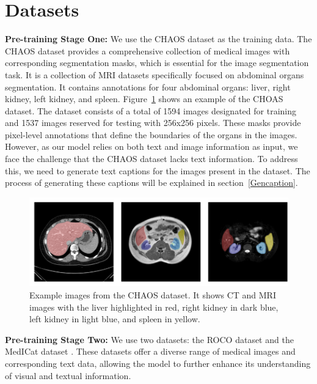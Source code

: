 \section{Datasets}
\label{Dataset}
{\bf Pre-training Stage One:} We use the CHAOS dataset \cite{kavur2021chaos} as the training data. The CHAOS dataset provides a comprehensive collection of medical images with corresponding segmentation masks, which is essential for the image segmentation task. It is a collection of MRI datasets specifically focused on abdominal organs segmentation. It contains annotations for four abdominal organs: liver, right kidney, left kidney, and spleen. Figure~\ref{fig:chaos} shows an example of the CHOAS dataset. The dataset consists of a total of 1594 images designated for training and 1537 images reserved for testing with 256x256 pixels. These masks provide pixel-level annotations that define the boundaries of the organs in the images. However, as our model relies on both text and image information as input, we face the challenge that the CHAOS dataset lacks text information. To address this, we need to generate text captions for the images present in the dataset. The process of generating these captions will be explained
in section~\ref{Gencaption}.

\begin{figure}[t]
\begin{center}
\includegraphics[width=1.0\linewidth]{Chapter_3/chap3_chaos.png}
\end{center}
   \caption{Example images from the CHAOS dataset. It shows CT and MRI images with the liver highlighted in red, right kidney in dark blue, left kidney in light blue, and spleen in yellow.
}
\label{fig:chaos}
\end{figure}

{\bf Pre-training Stage Two:} We use two datasets: the ROCO dataset \cite{Pelka2018RadiologyOI} and the MedICat dataset \cite{subramanian-2020-medicat}. These datasets offer a diverse range of medical images and corresponding text data, allowing the model to further enhance its understanding of visual and textual information.

